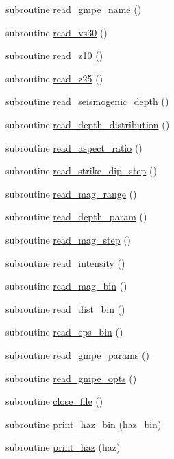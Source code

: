 \begin{DoxyCompactItemize}
subroutine \hyperlink{namespaceinput__module_a2b2d0311a6010b3b3e59cd947b58f429}{read\+\_\+gmpe\+\_\+name} ()
\item 
subroutine \hyperlink{namespaceinput__module_a4989c6ca8bc90648ca9587bee66d26b1}{read\+\_\+vs30} ()
\item 
subroutine \hyperlink{namespaceinput__module_a79ff648d45e7ac3f88ed461464c23901}{read\+\_\+z10} ()
\item 
subroutine \hyperlink{namespaceinput__module_a37d4fe4627c2f2d2f7063f9df9730476}{read\+\_\+z25} ()
\item 
subroutine \hyperlink{namespaceinput__module_a3b50bd9377741e86fbc4f43ec8e5ef93}{read\+\_\+seismogenic\+\_\+depth} ()
\item 
subroutine \hyperlink{namespaceinput__module_af139a93b520328955d0ff24a5283a948}{read\+\_\+depth\+\_\+distribution} ()
\item 
subroutine \hyperlink{namespaceinput__module_a2b52a667be52963438f117c68ae24bd1}{read\+\_\+aspect\+\_\+ratio} ()
\item 
subroutine \hyperlink{namespaceinput__module_a82104204d5b1aff59b087d4b87cf166b}{read\+\_\+strike\+\_\+dip\+\_\+step} ()
\item 
subroutine \hyperlink{namespaceinput__module_a9277ed03dfb00814405f98a5b0455d1c}{read\+\_\+mag\+\_\+range} ()
\item 
subroutine \hyperlink{namespaceinput__module_a7ce68361e26ec82b49e5313f235dc695}{read\+\_\+depth\+\_\+param} ()
\item 
subroutine \hyperlink{namespaceinput__module_a236da7bc51e5b4d79ef626a76b8dbea1}{read\+\_\+mag\+\_\+step} ()
\item 
subroutine \hyperlink{namespaceinput__module_acd40b5b88af0a4f619e2054305e670bb}{read\+\_\+intensity} ()
\item 
subroutine \hyperlink{namespaceinput__module_a9cf8432b15120af2d78057266ef67ae0}{read\+\_\+mag\+\_\+bin} ()
\item 
subroutine \hyperlink{namespaceinput__module_a8205f938072af7f3a84f190cdf9e32b3}{read\+\_\+dist\+\_\+bin} ()
\item 
subroutine \hyperlink{namespaceinput__module_a5d16b74f3e1993596b03be49827acd58}{read\+\_\+eps\+\_\+bin} ()
\item 
subroutine \hyperlink{namespaceinput__module_a86e724d27e380be85ae46ead8f422ab5}{read\+\_\+gmpe\+\_\+params} ()
\item 
subroutine \hyperlink{namespaceinput__module_ae5ed3783a3cd022cd1606bd280ca816d}{read\+\_\+gmpe\+\_\+opts} ()
\item 
subroutine \hyperlink{namespaceinput__module_a196ab42a030cc2c0efcd2bd463afa3f8}{close\+\_\+file} ()
\item 
subroutine \hyperlink{namespaceinput__module_ab34e9ffe1c6528cc2b5dc30c18126c11}{print\+\_\+haz\+\_\+bin} (haz\+\_\+bin)
\item 
subroutine \hyperlink{namespaceinput__module_a8dca2c193a492040a82753e06385b154}{print\+\_\+haz} (haz)
\end{DoxyCompactItemize}

